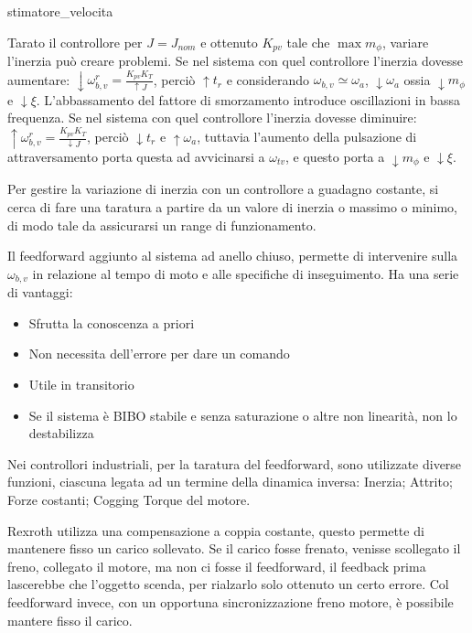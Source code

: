 {stimatore_velocita}

Tarato il controllore per \(J=J_{nom}\) e ottenuto \(K_{pv}\) tale che \(\max{m_\phi}\), variare l'inerzia può creare problemi.
Se nel sistema con quel controllore l'inerzia dovesse aumentare: \(\downarrow \omega_{b,v}^r=\frac{K_{pv}K_T}{\uparrow J}\), perciò \(\uparrow t_r\) e considerando \(\omega_{b,v}\simeq \omega_a\), \(\downarrow \omega_a\) ossia \(\downarrow m_\phi\) e \(\downarrow \xi\). L'abbassamento del fattore di smorzamento introduce oscillazioni in bassa frequenza.
Se nel sistema con quel controllore l'inerzia dovesse diminuire: \(\uparrow \omega_{b,v}^r=\frac{K_{pv}K_T}{\downarrow J}\), perciò \(\downarrow t_r\) e \(\uparrow \omega_a\), tuttavia l'aumento della pulsazione di attraversamento porta questa ad avvicinarsi a \(\omega_{tv}\), e questo porta a \(\downarrow m_\phi\) e \(\downarrow \xi\).


Per gestire la variazione di inerzia con un controllore a guadagno costante, si cerca di fare una taratura a partire da un valore di inerzia o massimo o minimo, di modo tale da assicurarsi un range di funzionamento.

Il feedforward aggiunto al sistema ad anello chiuso, permette di intervenire sulla \(\omega_{b,v}\) in relazione al tempo di moto e alle specifiche di inseguimento.
Ha una serie di vantaggi:
\begin{itemize}
    \item Sfrutta la conoscenza a priori
    \item Non necessita dell'errore per dare un comando
    \item Utile in transitorio
    \item Se il sistema è BIBO stabile e senza saturazione o altre non linearità, non lo destabilizza
\end{itemize}

Nei controllori industriali, per la taratura del feedforward, sono utilizzate diverse funzioni, ciascuna legata ad un termine della dinamica inversa: Inerzia; Attrito; Forze costanti; Cogging Torque del motore.

Rexroth utilizza una compensazione a coppia costante, questo permette di mantenere fisso un carico sollevato. Se il carico fosse frenato, venisse scollegato il freno, collegato il motore, ma non ci fosse il feedforward, il feedback prima lascerebbe che l'oggetto scenda, per rialzarlo solo ottenuto un certo errore. Col feedforward invece, con un opportuna sincronizzazione freno motore, è possibile mantere fisso il carico.

